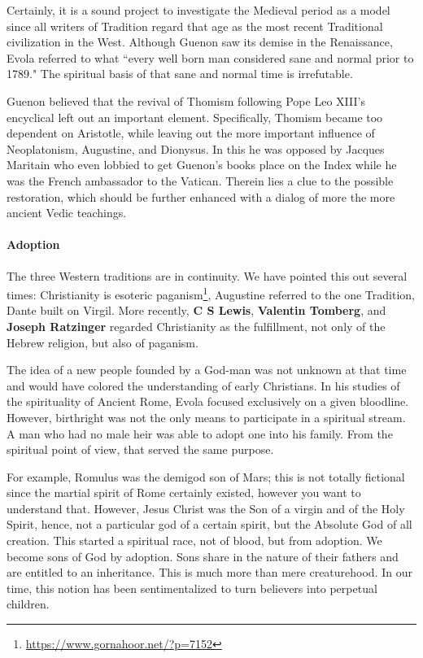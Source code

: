 Certainly, it is a sound project to investigate the Medieval period as a model since all writers of Tradition regard that age as the most recent Traditional civilization in the West. Although Guenon saw its demise in the Renaissance, Evola referred to what ``every well born man considered sane and normal prior to 1789." The spiritual basis of that sane and normal time is irrefutable.

Guenon believed that the revival of Thomism following Pope Leo XIII's encyclical left out an important element. Specifically, Thomism became too dependent on Aristotle, while leaving out the more important influence of Neoplatonism, Augustine, and Dionysus. In this he was opposed by Jacques Maritain who even lobbied to get Guenon's books place on the Index while he was the French ambassador to the Vatican. Therein lies a clue to the possible restoration, which should be further enhanced with a dialog of more the more ancient Vedic teachings.

\paragraph{Adoption}
The three Western traditions are in continuity. We have pointed this out several times: Christianity is esoteric paganism\footnote{\url{https://www.gornahoor.net/?p=7152}}, Augustine referred to the one Tradition, Dante built on Virgil. More recently, \textbf{C S Lewis}, \textbf{Valentin Tomberg}, and \textbf{Joseph Ratzinger} regarded Christianity as the fulfillment, not only of the Hebrew religion, but also of paganism.

The idea of a new people founded by a God-man was not unknown at that time and would have colored the understanding of early Christians. In his studies of the spirituality of Ancient Rome, Evola focused exclusively on a given bloodline. However, birthright was not the only means to participate in a spiritual stream. A man who had no male heir was able to adopt one into his family. From the spiritual point of view, that served the same purpose.

For example, Romulus was the demigod son of Mars; this is not totally fictional since the martial spirit of Rome certainly existed, however you want to understand that. However, Jesus Christ was the Son of a virgin and of the Holy Spirit, hence, not a particular god of a certain spirit, but the Absolute God of all creation. This started a spiritual race, not of blood, but from adoption. We become sons of God by adoption. Sons share in the nature of their fathers and are entitled to an inheritance. This is much more than mere creaturehood. In our time, this notion has been sentimentalized to turn believers into perpetual children.

